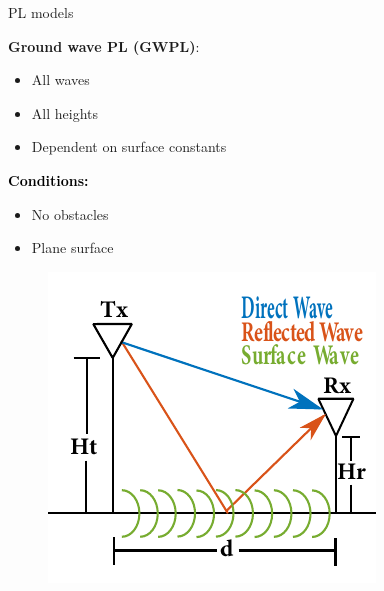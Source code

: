 \documentclass[10pt]{beamer}
\begin{document}
\begin{frame}{PL models}
\begin{minipage}{.45\textwidth}
\raggedright\textcolor{thomaspurple}{\textbf{Ground wave PL (GWPL)}:}
\begin{itemize}
\item All waves
\item All heights
\item Dependent on surface constants
\end{itemize} 

\vspace{1em}
\textcolor{black}{\textbf{Conditions:}}
\begin{itemize}
\item No obstacles
\item Plane surface
\end{itemize}

\end{minipage}
\begin{minipage}{0.5\textwidth}
\begin{figure}[!htbp]
 \centering
  \includegraphics[width = \columnwidth]{figures/poster_cropped_1.pdf}
  \end{figure}
\end{minipage}
\end{frame}

\end{document}
